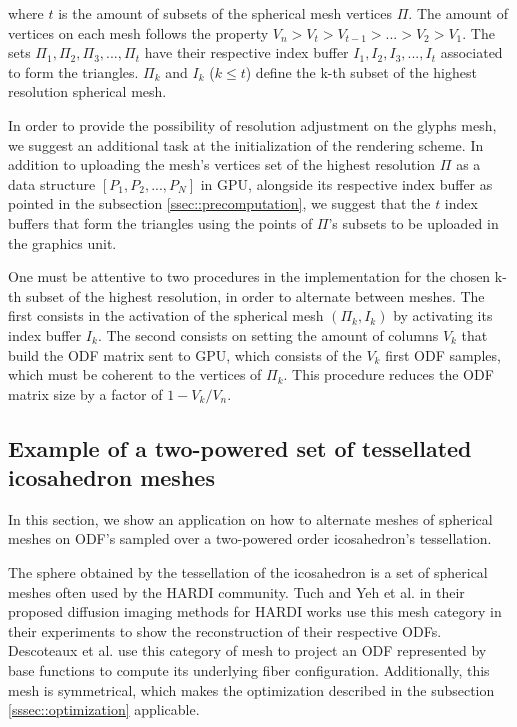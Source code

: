 \documentclass[twoside,twocolumn,10pt]{article}
\begin{document}
where $t$ is the amount of subsets of the spherical mesh vertices $\Pi$. The amount of vertices on each mesh follows the property $V_n > V_t > V_{t-1} > ... > V_2 > V_1$. The sets $\Pi_{1}, \Pi_{2}, \Pi_{3}, ..., \Pi_{t}$ have their respective index buffer $I_{1}, I_{2}, I_{3}, ..., I_{t}$ associated to form the triangles. $\Pi_k$ and $I_k$ ($k \leq t$) define the k-th subset of the highest resolution spherical mesh.

In order to provide the possibility of resolution adjustment on the glyphs mesh, we suggest an additional task at the initialization of the rendering scheme. In addition to uploading the mesh's vertices set of the highest resolution $\Pi$ as a data structure $[P_1, P_2, ..., P_N]$ in GPU, alongside its respective index buffer as pointed in the subsection \ref{ssec::precomputation}, we suggest that the $t$ index buffers that form the triangles using the points of $\Pi$'s subsets to be uploaded in the graphics unit.


One must be attentive to two procedures in the implementation for the chosen k-th subset of the highest resolution, in order to alternate between meshes. The first consists in the activation of the spherical mesh $(\Pi_k, I_k)$ by activating its index buffer $I_k$. The second consists on setting the amount of columns $V_k$ that build the ODF matrix sent to GPU, which consists of the $V_k$ first ODF samples, which must be coherent to the vertices of $\Pi_k$. This procedure reduces the ODF matrix size by a factor of $1-V_k/V_n$.







\subsection{Example of a two-powered set of tessellated icosahedron meshes}

In this section, we show an application on how to alternate meshes of spherical meshes on ODF's sampled over a two-powered order icosahedron's tessellation.

The sphere obtained by the tessellation of the icosahedron is a set of spherical meshes often used by the HARDI community. Tuch \cite{TuchQBall2004} and Yeh et al. \cite{yeh2010} in their proposed diffusion imaging methods for HARDI works use this mesh category in their experiments to show the reconstruction of their respective ODFs. Descoteaux et al. \cite{descoteaux2007} use this category of mesh to project an ODF represented by base functions to compute its underlying fiber configuration. Additionally, this mesh is symmetrical, which makes the optimization described in the subsection \ref{sssec::optimization} applicable.
\end{document}
